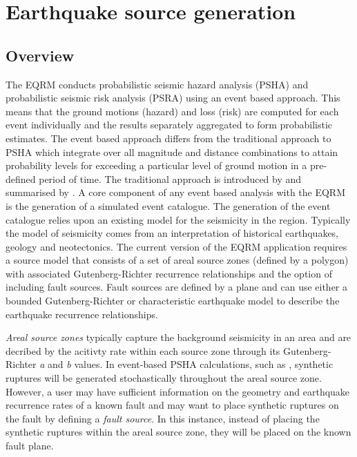 \chapter{Earthquake source generation}
\label{ch:source}

\section{Overview}

The EQRM conducts probabilistic seismic hazard analysis (PSHA) and
probabilistic seismic risk analysis (PSRA) using an event based
approach. This means that the ground motions (hazard) and loss
(risk) are computed for each event individually and the results
separately aggregated to form probabilistic estimates. The event
based approach differs from the traditional approach to PSHA which
integrate over all magnitude and distance combinations to attain
probability levels for exceeding a particular level of ground
motion in a pre-defined period of time. The traditional approach
is introduced by \citet{dr_Cornell68a} and summarised by
\citet{dr_McGuire90a}. A core component of any event based
analysis with the EQRM is the generation of a simulated
event  catalogue. The
generation of the event catalogue relies upon an existing model for
the seismicity in the region. Typically the  model of seismicity comes
 from an interpretation of historical earthquakes,
 geology and neotectonics. The current version of the EQRM application requires a source model
that consists of a set of areal source zones (defined by a polygon) with associated
Gutenberg-Richter recurrence relationships and the option of including fault sources. Fault sources are defined by a plane
and can use either a bounded Gutenberg-Richter \citep{dr_Kramer96a} or characteristic earthquake model \citep{eqrm_Schwartz84} 
to describe the earthquake recurrence relationships. 

\emph{Areal source zones} typically capture the background seismicity in an area and are decribed by the acitivty rate within
each source zone through its Gutenberg-Richter \emph{a} and \emph{b} values. In event-based PSHA calculations, such as ,
synthetic ruptures will be generated stochastically throughout the areal source zone. However, a user may have sufficient information 
on the geometry and earthquake recurrence rates of a known fault and may want to place synthetic ruptures on the fault by defining a 
\emph{fault source}. In this instance, instead of placing the synthetic ruptures within the areal source zone, they will be placed 
on the known fault plane. \\

